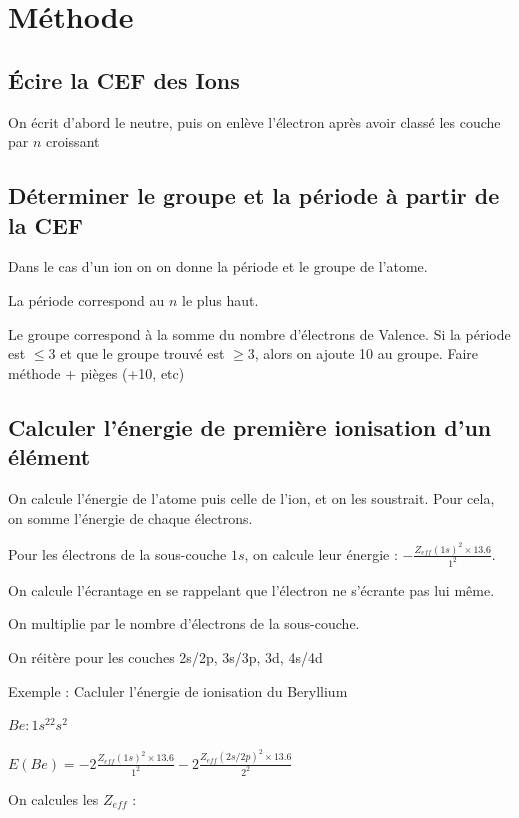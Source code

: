 \documentclass[french]{yLectureNote}
\begin{document}
\section{Méthode}
\subsection{Écire la CEF des Ions}
On écrit d'abord le neutre, puis on enlève l'électron après avoir classé les couche par $n$ croissant
\subsection{Déterminer le groupe et la période à partir de la CEF}
Dans le cas d'un ion on on donne la période et le groupe de l'atome.

La période correspond au $n$ le plus haut.

Le groupe correspond à la somme du nombre d'électrons de Valence. Si la période est $\leq 3$ et que le groupe trouvé est $\geq 3$, alors on ajoute 10 au groupe.
Faire méthode + pièges (+10, etc)
\subsection{Calculer l'énergie de première ionisation d'un élément}
On calcule l'énergie de l'atome puis celle de l'ion, et on les soustrait.
Pour cela, on somme l'énergie de chaque électrons.

Pour les électrons de la sous-couche $1s$, on calcule leur énergie : $-\frac{Z_{eff}(1s)^2\times 13.6}{1^2}$.

On calcule l'écrantage en se rappelant que l'électron ne s'écrante pas lui m\^eme.

On multiplie par le nombre d'électrons de la sous-couche.

On réitère pour les couches 2s/2p, 3s/3p, 3d, 4s/4d

Exemple : Cacluler l'énergie de ionisation du Beryllium

$Be : 1s^22s^2$

$E(Be) = -2\frac{Z_{eff}(1s)^2\times 13.6}{1^2} - 2$$\frac{Z_{eff}(2s/2p)^2\times 13.6}{2^2}$

On calcules les $Z_{eff}$ :
\end{document}
